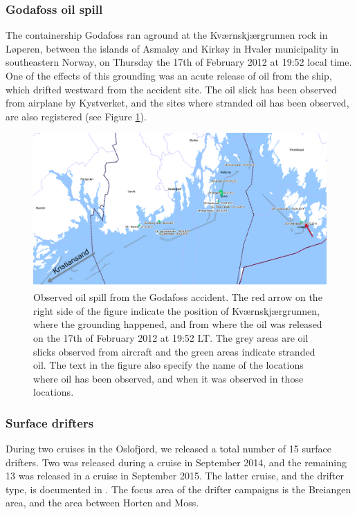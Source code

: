 \subsubsection{Godafoss oil spill}
The containership Godafoss ran aground at the Kv{\ae}rnskj{\ae}rgrunnen rock in L{\o}peren, between the islands of Asmal{\o}y and Kirk{\o}y in Hvaler municipality in southeastern Norway, on Thursday the 17th of February 2012 at 19:52 local time. One of the effects of this grounding was an acute release of oil from the ship, which drifted westward from the accident site. The oil slick has been observed from airplane by Kystverket, and the sites where stranded oil has been observed, are also registered (see Figure \ref{fig:godafoss_oil}).

\begin{figure}[ht]
\centerline{
\includegraphics*[width=\textwidth]{Figurer/Godafoss}
}
\caption{\small
Observed oil spill from the Godafoss accident. The red arrow on the right side of the figure indicate the position of Kv{\ae}rnskj{\ae}rgrunnen, where the grounding happened, and from where the oil was released on the 17th of February 2012 at 19:52 LT. The grey areas are oil slicks observed from aircraft and the green areas indicate stranded oil. The text in the figure also specify the name of the locations where oil has been observed, and when it was observed in those locations.}
\label{fig:godafoss_oil}
\end{figure}

\subsubsection{Surface drifters}
During two cruises in the Oslofjord, we released a total number of 15 surface drifters. Two was released during a cruise in September 2014, and the remaining 13 was released in a cruise in September 2015. The latter cruise, and the drifter type, is documented in \cite{hjelm:etal:2016}. The focus area of the drifter campaigns is the Breiangen area, and the area between Horten and Moss.


